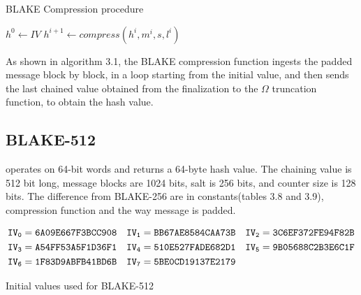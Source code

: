   \begin{algorithm}
  \caption{BLAKE Compression procedure \cite{00002}}
  \begin{algorithmic}[1]
    \State $ h^{0} \gets IV $
      \State $h^{i+1} \gets compress(h^{i}, m^{i}, s, l^{i})$
    \EndFor
    \State{}
  \end{algorithmic}
  \end{algorithm}

  As shown in algorithm 3.1, the BLAKE compression function ingests the padded message block by block, in a loop 
  starting from the initial value, and then sends the last chained value obtained from the finalization to the 
  $\Omega$ truncation function, to obtain the hash value.

\subsection{BLAKE-512}

operates on 64-bit words and returns a 64-byte hash value. The chaining value is 512 bit long, message blocks are
1024 bits, salt is 256 bits, and counter size is 128 bits. The difference from BLAKE-256 are in constants(tables 3.8 
and 3.9), compression function and the way message is padded.

  \begin{table}
    \begin{align*}
      {\tt IV_{0}} &= {\tt 6A09E667F3BCC908} & {\tt IV_{1}} &= {\tt BB67AE8584CAA73B} & {\tt IV_{2}} &= {\tt 3C6EF372FE94F82B} \\
      {\tt IV_{3}} &= {\tt A54FF53A5F1D36F1} & {\tt IV_{4}} &= {\tt 510E527FADE682D1} & {\tt IV_{5}} &= {\tt 9B05688C2B3E6C1F} \\
      {\tt IV_{6}} &= {\tt 1F83D9ABFB41BD6B} & {\tt IV_{7}} &= {\tt 5BE0CD19137E2179} &                                        \\      
    \end{align*}
    \caption{Initial values used for BLAKE-512 \cite{00002}}
  \end{table}
  
